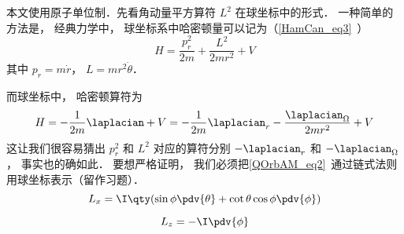 

本文使用原子单位制．先看角动量平方算符 $L^2$ 在球坐标中的形式． 一种简单的方法是， 经典力学中， 球坐标系中哈密顿量可以记为（\autoref{HamCan_eq3}~）
\begin{equation}
H = \frac{p_r^2}{2m} + \frac{L^2}{2mr^2} + V
\end{equation}
其中 $p_r = m\dot r$， $L = mr^2\dot\theta$．

而球坐标中， 哈密顿算符为
\begin{equation}
H = -\frac{1}{2m}\laplacian + V = -\frac{1}{2m}\laplacian_r -\frac{\laplacian_\Omega}{2mr^2} + V
\end{equation}
这让我们很容易猜出 $p_r^2$ 和 $L^2$ 对应的算符分别 $-\laplacian_r$ 和 $-\laplacian_\Omega$， 事实也的确如此． 要想严格证明， 我们必须把\autoref{QOrbAM_eq2}~通过链式法则用球坐标表示（留作习题）．
\begin{equation}
L_x = \I \qty(\sin\phi\pdv{\theta} + \cot\theta\cos\phi\pdv{\phi})
\end{equation}

\begin{equation}
L_z = -\I\pdv{\phi}
\end{equation}

